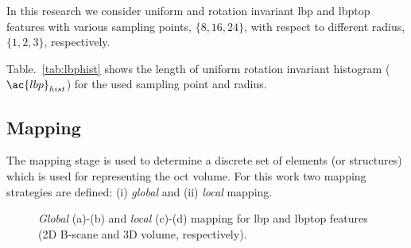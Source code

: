 In this research we consider uniform and rotation invariant \ac{lbp} and \ac{lbptop} features with various sampling points, $\{8,16,24\}$, with respect to different radius, $\{1,2,3\}$, respectively.

Table.~\ref{tab:lbphist} shows the length of uniform rotation invariant histogram ($\ac{lbp}_{hist}$) for the used sampling point and radius.
\begin{table}
\caption{length of $\ac{lbp}_{hist}$ for different sampling points and radius ($\{S,R\}$) in \ac{lbp} descriptor}
\label{tab:lbphist}
\end{table}

\subsection{Mapping} \label{subsec:mapping}
The mapping stage is used to determine a discrete set of elements (or structures) which is used for representing the \ac{oct} volume.
For this work two mapping strategies are defined: (i) \emph{global} and (ii) \emph{local} mapping.

\begin{figure}[t]
\begin{center}
\hspace*{\fill}
\hfill
{}\hfill
{}\hfill
{}

\hspace*{\fill}
\caption{\emph{Global} (a)-(b) and \emph{local} (c)-(d) mapping for \ac{lbp} and \ac{lbptop} features (2D B-scane and 3D volume, respectively).}
\end{center}
\label{fig:lgmapping}
\end{figure}

